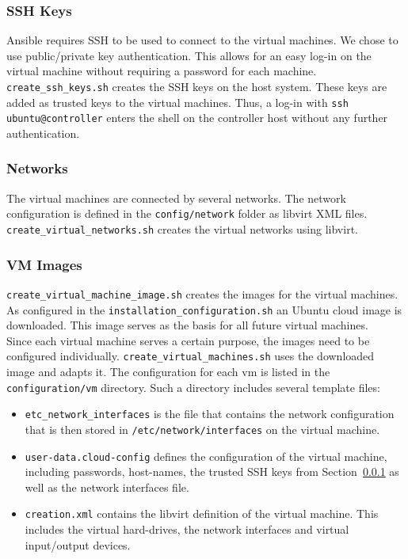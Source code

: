 \begin{appendix}
\subsubsection{SSH Keys}
\label{ssh-keys}
Ansible requires SSH to be used to connect to the virtual machines. We chose to use public/private key authentication. This allows for an easy log-in on the virtual machine without requiring a password for each machine. \texttt{create\_ssh\_keys.sh} creates the SSH keys on the host system. These keys are added as trusted keys to the virtual machines. Thus, a log-in with \texttt{ssh ubuntu@controller} enters the shell on the controller host without any further authentication.

\subsubsection{Networks}
The virtual machines are connected by several networks. The network configuration is defined in the \texttt{config/network} folder as libvirt XML files. \texttt{create\_virtual\_networks.sh} creates the virtual networks using libvirt.


\subsubsection{VM Images}
\texttt{create\_virtual\_machine\_image.sh} creates the images for the virtual machines. As configured in the \texttt{installation\_configuration.sh} an Ubuntu cloud image is downloaded. This image serves as the basis for all future virtual machines. \\

Since each virtual machine serves a certain purpose, the images need to be configured individually. \texttt{create\_virtual\_machines.sh} uses the downloaded image and adapts it. The configuration for each vm is listed in the \texttt{configuration/vm} directory. Such a directory includes several template files:

\begin{itemize}
	\item \texttt{etc\_network\_interfaces} is the file that contains the network configuration that is then stored in \texttt{/etc/network/interfaces} on the virtual machine.
	\item \texttt{user-data.cloud-config} defines the configuration of the virtual machine, including passwords, host-names, the trusted SSH keys from Section~\ref{ssh-keys} as well as the network interfaces file.
	\item \texttt{creation.xml} contains the libvirt definition of the virtual machine. This includes the virtual hard-drives, the network interfaces and virtual input/output devices.
\end{itemize}


\end{appendix}
